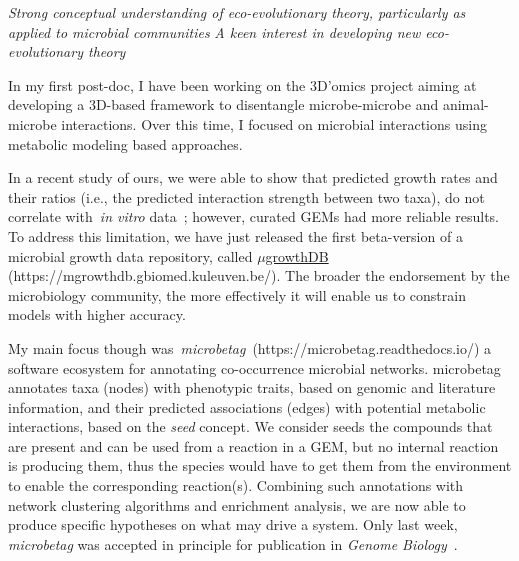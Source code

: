 \textit{
    Strong conceptual understanding of eco-evolutionary theory,
    particularly as applied to microbial communities
}
\textit{A keen interest in developing new eco-evolutionary theory}



    In my first post-doc, I have been working on the 3D'omics project
    aiming at developing a 3D-based framework to disentangle microbe-microbe and animal-microbe interactions.
    Over this time, I focused on microbial interactions using metabolic modeling based approaches.

    In a recent study of ours, we were able to show that 
    predicted growth rates and their ratios 
    (i.e., the predicted interaction strength between two taxa), 
    do not correlate with~\textit{in vitro} data~\cite{joseph2024predicting}; 
    however, curated GEMs had more reliable results.
    To address this limitation, we have just released the first beta-version of a microbial growth data repository, 
    called \href{https://mgrowthdb.gbiomed.kuleuven.be/}{{$\mu$}growthDB}
    (https://mgrowthdb.gbiomed.kuleuven.be/).
    The broader the endorsement by the microbiology community, 
    the more effectively it will enable us to constrain models with higher accuracy.

    My main focus though was~\textit{microbetag}~(https://microbetag.readthedocs.io/) 
    a software ecosystem for annotating co-occurrence microbial networks.
    microbetag annotates taxa (nodes) with phenotypic traits, based on genomic and literature information,
    and their predicted associations (edges) with potential metabolic interactions, based on the \textit{seed} concept. 
    We consider seeds the compounds that are present and can be used from a reaction in a GEM, but no internal reaction 
    is producing them, thus the species would have to get them from the environment to enable the corresponding reaction(s).
    Combining such annotations with network clustering algorithms and enrichment analysis, we are now able to 
    produce specific hypotheses on what may drive a system.
    Only last week, \textit{microbetag} was accepted in principle for publication in 
    \textit{Genome Biology}~\cite{zafeiropoulos2024microbetag}. 


